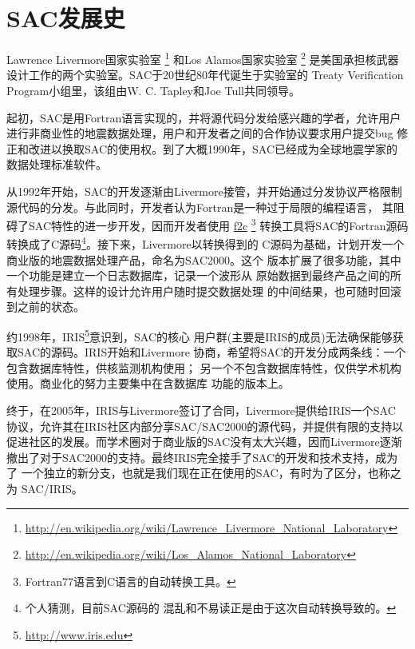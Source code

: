 \section{SAC发展史}
\label{sec:history}

Lawrence Livermore国家实验室
\footnote{\url{http://en.wikipedia.org/wiki/Lawrence\_Livermore\_National\_Laboratory}}
和Los Alamos国家实验室
\footnote{\url{http://en.wikipedia.org/wiki/Los\_Alamos\_National\_Laboratory}}
是美国承担核武器设计工作的两个实验室。SAC于20世纪80年代诞生于实验室的
Treaty Verification Program小组里，该组由W. C. Tapley和Joe Tull共同领导。

起初，SAC是用Fortran语言实现的，并将源代码分发给感兴趣的学者，允许用户
进行非商业性的地震数据处理，用户和开发者之间的合作协议要求用户提交bug
修正和改进以换取SAC的使用权。到了大概1990年，SAC已经成为全球地震学家的
数据处理标准软件。

从1992年开始，SAC的开发逐渐由Livermore接管，并开始通过分发协议严格限制
源代码的分发。与此同时，开发者认为Fortran是一种过于局限的编程语言，
其阻碍了SAC特性的进一步开发，因而开发者使用
\href{http://www.netlib.org/f2c/}{f2c}
\footnote{Fortran77语言到C语言的自动转换工具。}
转换工具将SAC的Fortran源码转换成了C源码\footnote{个人猜测，目前SAC源码的
混乱和不易读正是由于这次自动转换导致的。}。接下来，Livermore以转换得到的
C源码为基础，计划开发一个商业版的地震数据处理产品，命名为SAC2000。这个
版本扩展了很多功能，其中一个功能是建立一个日志数据库，记录一个波形从
原始数据到最终产品之间的所有处理步骤。这样的设计允许用户随时提交数据处理
的中间结果，也可随时回滚到之前的状态。

约1998年，IRIS\footnote{\url{http://www.iris.edu}}意识到，SAC的核心
用户群(主要是IRIS的成员)无法确保能够获取SAC的源码。IRIS开始和Livermore
协商，希望将SAC的开发分成两条线：一个包含数据库特性，供核监测机构使用；
另一个不包含数据库特性，仅供学术机构使用。商业化的努力主要集中在含数据库
功能的版本上。

终于，在2005年，IRIS与Livermore签订了合同，Livermore提供给IRIS一个SAC
协议，允许其在IRIS社区内部分享SAC/SAC2000的源代码，并提供有限的支持以
促进社区的发展。而学术圈对于商业版的SAC没有太大兴趣，因而Livermore逐渐
撤出了对于SAC2000的支持。最终IRIS完全接手了SAC的开发和技术支持，成为了
一个独立的新分支，也就是我们现在正在使用的SAC，有时为了区分，也称之为
SAC/IRIS。

